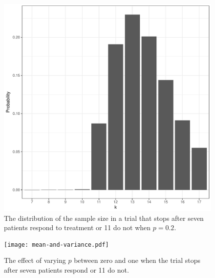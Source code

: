 \documentclass[12pt]{article}
\begin{document}

\begin{figure}[bp!]
\centering
\includegraphics[width=\textwidth]{snb-first-plot.pdf}
\caption{
The distribution of the sample size in a trial that stops after seven patients
respond to treatment or 11 do not when $p=0.2$.
}
\label{fig:kane_viz}
\end{figure}

\begin{figure}[bp!]
\centering
\texttt{[image: mean-and-variance.pdf]}
\caption{
The effect of varying $p$ between zero and one when the trial stops after
seven patients respond or 11 do not.
}
\label{fig:kane_viz}
\end{figure}


\end{document}
